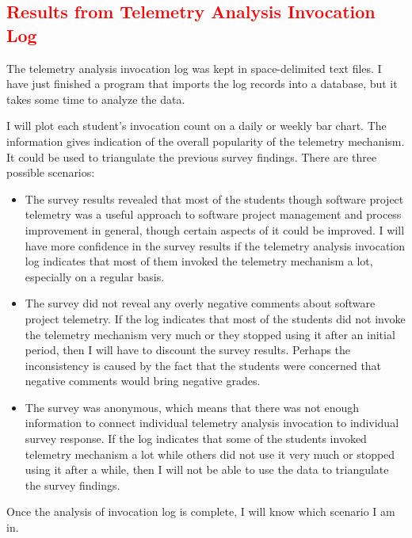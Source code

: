 \subsection{\textcolor{red}{Results from Telemetry Analysis Invocation Log}}
\label{EvaluationInClassroom:Results:InvocationLog}

The telemetry analysis invocation log was kept in space-delimited text files. I have just finished a program that imports the log records into a database, but it takes some time to analyze the data.

I will plot each student's invocation count on a daily or weekly bar chart. The information gives indication of the overall popularity of the telemetry mechanism. It could be used to triangulate the previous survey findings. There are three possible scenarios:

\begin{itemize}
	\item The survey results revealed that most of the students though software project telemetry was a useful approach to software project management and process improvement in general, though certain aspects of it could be improved. I will have more confidence in the survey results if the telemetry analysis invocation log indicates that most of them invoked the telemetry mechanism a lot, especially on a regular basis. 
	
	\item The survey did not reveal any overly negative comments about software project telemetry. If the log indicates that most of the students did not invoke the telemetry mechanism very much or they stopped using it after an initial period, then I will have to discount the survey results. Perhaps the inconsistency is caused by the fact that the students were concerned that negative comments would bring negative grades.

  \item The survey was anonymous, which means that there was not enough information to connect individual telemetry analysis invocation to individual survey response. If the log indicates that some of the students invoked telemetry mechanism a lot while others did not use it very much or stopped using it after a while, then I will not be able to use the data to triangulate the survey findings.
\end{itemize}

Once the analysis of invocation log is complete, I will know which scenario I am in.


